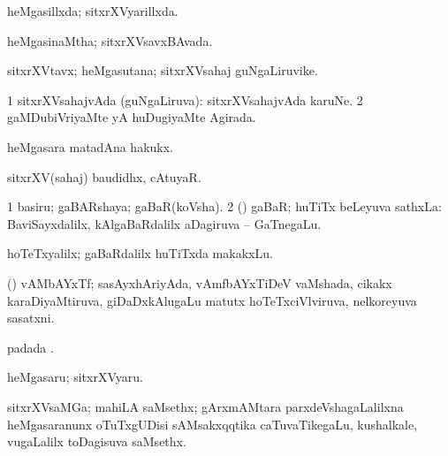 {{{{{{\bentry
{} 
\gl{\gu}
\expl{}
\bmng
heMgasillxda; sitxrXVyarillxda. 
\emng
\eentry

\bentry
{} 
\gl{\gu}
\expl{}
\bmng
heMgasinaMtha; sitxrXVsavxBAvada. 
\emng
\eentry

\bentry
{} 
\gl{\nA}
\expl{}
\bmng
sitxrXVtavx; heMgasutana; sitxrXVsahaj guNgaLiruvike. 
\emng
\eentry

\bentry
{} 
\gl{\gu}
\expl{}
\bmng
\bnum
\num{1} sitxrXVsahajvAda (guNgaLiruva):  sitxrXVsahajvAda karuNe. 
\num{2} gaMDubiVriyaMte yA huDugiyaMte Agirada. 
\enum
\emng
\eentry

\bentry
{} 
\gl{\nA}
\expl{}
\bmng
heMgasara matadAna hakukx. 
\emng
\eentry

\bentry
{} 
\gl{\nA}
\expl{}
\bmng
sitxrXV(sahaj) baudidhx, cAtuyaR. 
\emng
\eentry

\bentry
{} 
\gl{\nA}
\bmng
\bnum
\num{1} basiru; gaBARshaya; gaBaR(koVsha). 
\num{2} (\rUpa) gaBaR; huTiTx beLeyuva sathxLa:  BaviSayxdalilx, kAlgaBaRdalilx aDagiruva -- GaTnegaLu. 
\enum
\emng

\noindent
\gl{\pagu}
\expl{}
\bmng
{} hoTeTxyalilx; gaBaRdalilx huTiTxda makakxLu. 
\emng
\eentry

\bentry
{} 
\gl{\nA}
\expl{}
\bmng
(\AseTxrXV) vAMbAYxTf; sasAyxhAriyAda, vAmfbAYxTiDeV vaMshada, cikakx karaDiyaMtiruva, giDaDxkAlugaLu matutx hoTeTxciVlviruva, nelkoreyuva sasatxni. 
\emng
\eentry

\bentry
{} 
\gl{\nA}
\expl{}
\bmng
{} padada \bava. 
\emng
\eentry

\bentry
{} 
\gl{\nA}
\expl{}
\bmng
heMgasaru; sitxrXVyaru. 
\emng
\eentry

\bentry
{} 
\gl{\nA}
\expl{}
\bmng
{} 
\emng
\eentry

\bentry
{} 
\gl{\nA}
\expl{}
\bmng
sitxrXVsaMGa; mahiLA saMsethx; gArxmAMtara parxdeVshagaLalilxna heMgasaranunx oTuTxgUDisi sAMsakxqqtika caTuvaTikegaLu, kushalkale, \mo vugaLalilx toDagisuva saMsethx. 
\emng
\eentry

}}}}}}
